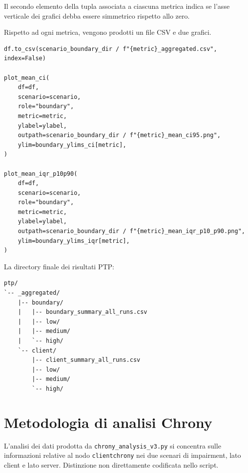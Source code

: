 Il secondo elemento della tupla associata a ciascuna metrica indica se l'asse
verticale dei grafici debba essere simmetrico rispetto allo zero.

Rispetto ad ogni metrica, vengono prodotti un file CSV e due grafici.

\begin{listing}[H]
\begin{verbatim}
df.to_csv(scenario_boundary_dir / f"{metric}_aggregated.csv", index=False)

plot_mean_ci(
    df=df,
    scenario=scenario,
    role="boundary",
    metric=metric,
    ylabel=ylabel,
    outpath=scenario_boundary_dir / f"{metric}_mean_ci95.png",
    ylim=boundary_ylims_ci[metric],
)

plot_mean_iqr_p10p90(
    df=df,
    scenario=scenario,
    role="boundary",
    metric=metric,
    ylabel=ylabel,
    outpath=scenario_boundary_dir / f"{metric}_mean_iqr_p10_p90.png",
    ylim=boundary_ylims_iqr[metric],
)
\end{verbatim}
\caption{Produzione dei CSV aggregati e dei grafici per una metrica PTP.}
\label{lst:ptp-aggregated-output}
\end{listing}

La directory finale dei risultati PTP:

\begin{listing}[H]
\begin{verbatim}
ptp/
`-- _aggregated/
    |-- boundary/
    |   |-- boundary_summary_all_runs.csv
    |   |-- low/
    |   |-- medium/
    |   `-- high/
    `-- client/
        |-- client_summary_all_runs.csv
        |-- low/
        |-- medium/
        `-- high/
\end{verbatim}
\caption{Organizzazione degli output aggregati prodotti dal parser PTP.}
\label{lst:ptp-output-structure}
\end{listing}

\section{Metodologia di analisi Chrony}

\begin{sloppypar}
  L'analisi dei dati prodotta da \texttt{chrony\_analysis\_v3.py} si concentra sulle
  informazioni relative al nodo \texttt{clientchrony} nei due scenari di impairment, 
  lato client e lato server. Distinzione non direttamente codificata nello script.
\end{sloppypar}

